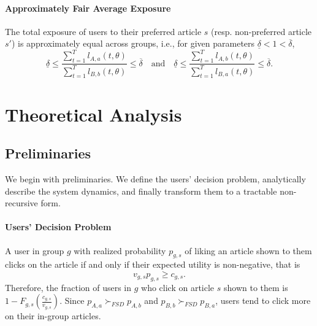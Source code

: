 \documentclass[letterpaper]{article} %
\begin{document}
\paragraph{Approximately Fair Average Exposure}
The total exposure of users to their preferred article $s$ (resp. non-preferred article $s'$) is approximately equal across groups, i.e.,  for given parameters $\underline{\delta} <1 < \overline{\delta}$,
\footnotesize
\begin{equation}
\label{eq:average_exposure}
    \underline{\delta} \leq \frac{\sum_{t=1}^T l_{A,a}(t,\theta)}{\sum_{t=1}^T l_{B,b}(t,\theta)}  \leq \overline{\delta}\quad \text{and} \quad \underline{\delta}\leq \frac{\sum_{t=1}^T l_{A,b}(t,\theta)}{\sum_{t=1}^T l_{B,a}(t,\theta)}  \leq \overline{\delta}.
\end{equation}
\normalsize

\section{Theoretical Analysis}\label{sec:analysis}

\subsection{Preliminaries}
We begin with preliminaries.
We define the users' decision problem, analytically describe the system dynamics, and finally transform them to a tractable non-recursive form.

\paragraph{Users' Decision Problem}
A user in group $g$ with realized probability $p_{g,s}$ of liking an article shown to them clicks on the article if and only if their expected utility is non-negative, that is
\footnotesize
\begin{equation}
    v_{g,s}p_{g,s} \geq c_{g,s}.
\end{equation}
\normalsize
Therefore, the fraction of users in $g$ who click on  article  $s$ shown to them is $1-F_{g,s}(\frac{c_{g,s}}{v_{g,s}})$.
Since $p_{A,a} \succ_{FSD} p_{A, b}$ and $p_{B,b} \succ_{FSD} p_{B, a}$, users tend to click more on their in-group articles.
\end{document}
